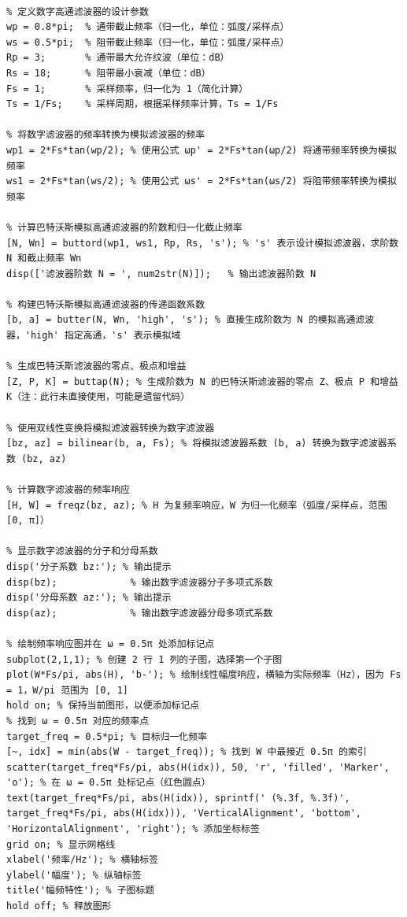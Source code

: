\documentclass[12pt,hyperref,a4paper,UTF8]{ctexart}
\begin{document}
\begin{lstlisting}[style=matlab, caption={ MATLAB实现代码}]

% 定义数字高通滤波器的设计参数
wp = 0.8*pi;  % 通带截止频率（归一化，单位：弧度/采样点）
ws = 0.5*pi;  % 阻带截止频率（归一化，单位：弧度/采样点）
Rp = 3;       % 通带最大允许纹波（单位：dB）
Rs = 18;      % 阻带最小衰减（单位：dB）
Fs = 1;       % 采样频率，归一化为 1（简化计算）
Ts = 1/Fs;    % 采样周期，根据采样频率计算，Ts = 1/Fs

% 将数字滤波器的频率转换为模拟滤波器的频率
wp1 = 2*Fs*tan(wp/2); % 使用公式 ωp' = 2*Fs*tan(ωp/2) 将通带频率转换为模拟频率
ws1 = 2*Fs*tan(ws/2); % 使用公式 ωs' = 2*Fs*tan(ωs/2) 将阻带频率转换为模拟频率

% 计算巴特沃斯模拟高通滤波器的阶数和归一化截止频率
[N, Wn] = buttord(wp1, ws1, Rp, Rs, 's'); % 's' 表示设计模拟滤波器，求阶数 N 和截止频率 Wn
disp(['滤波器阶数 N = ', num2str(N)]);   % 输出滤波器阶数 N

% 构建巴特沃斯模拟高通滤波器的传递函数系数
[b, a] = butter(N, Wn, 'high', 's'); % 直接生成阶数为 N 的模拟高通滤波器，'high' 指定高通，'s' 表示模拟域

% 生成巴特沃斯滤波器的零点、极点和增益
[Z, P, K] = buttap(N); % 生成阶数为 N 的巴特沃斯滤波器的零点 Z、极点 P 和增益 K（注：此行未直接使用，可能是遗留代码）

% 使用双线性变换将模拟滤波器转换为数字滤波器
[bz, az] = bilinear(b, a, Fs); % 将模拟滤波器系数 (b, a) 转换为数字滤波器系数 (bz, az)

% 计算数字滤波器的频率响应
[H, W] = freqz(bz, az); % H 为复频率响应，W 为归一化频率（弧度/采样点，范围 [0, π]）

% 显示数字滤波器的分子和分母系数
disp('分子系数 bz:'); % 输出提示
disp(bz);             % 输出数字滤波器分子多项式系数
disp('分母系数 az:'); % 输出提示
disp(az);             % 输出数字滤波器分母多项式系数

% 绘制频率响应图并在 ω = 0.5π 处添加标记点
subplot(2,1,1); % 创建 2 行 1 列的子图，选择第一个子图
plot(W*Fs/pi, abs(H), 'b-'); % 绘制线性幅度响应，横轴为实际频率（Hz），因为 Fs = 1，W/pi 范围为 [0, 1]
hold on; % 保持当前图形，以便添加标记点
% 找到 ω = 0.5π 对应的频率点
target_freq = 0.5*pi; % 目标归一化频率
[~, idx] = min(abs(W - target_freq)); % 找到 W 中最接近 0.5π 的索引
scatter(target_freq*Fs/pi, abs(H(idx)), 50, 'r', 'filled', 'Marker', 'o'); % 在 ω = 0.5π 处标记点（红色圆点）
text(target_freq*Fs/pi, abs(H(idx)), sprintf(' (%.3f, %.3f)', target_freq*Fs/pi, abs(H(idx))), 'VerticalAlignment', 'bottom', 'HorizontalAlignment', 'right'); % 添加坐标标签
grid on; % 显示网格线
xlabel('频率/Hz'); % 横轴标签
ylabel('幅度'); % 纵轴标签
title('幅频特性'); % 子图标题
hold off; % 释放图形


\end{lstlisting}
\end{document}
